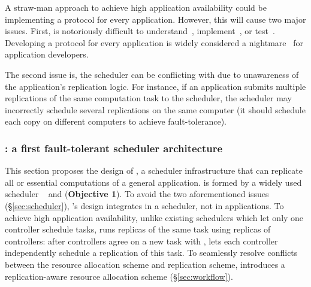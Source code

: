 A straw-man approach to achieve high application availability could be 
implementing a \paxos protocol for every application. However, this will cause 
two major issues. First, \paxos is notoriously difficult to 
understand~\cite{raft:usenix14,paxos:simple}, implement~\cite{paxos:practical, 
paxos:live}, or test~\cite{modist:nsdi09,demeter:sosp11}. Developing a 
\paxos protocol for every application is widely considered a 
nightmare~\cite{modist:nsdi09,demeter:sosp11,paxos:live} for application 
developers.

The second issue is, the scheduler can be conflicting with \paxos due to 
unawareness of the application's \paxos replication logic. For instance, if an 
application submits multiple replications of the same computation task to the 
scheduler, the scheduler may incorrectly schedule several replications on the 
same computer (it should schedule each copy on different computers to achieve 
\paxos fault-tolerance).

\vspace{-.15in}\subsubsection{\tripod: a first fault-tolerant scheduler 
architecture} 
\label{sec:scheduler-arch}\vspace{-.075in}

This section proposes the design of \tripod, a scheduler infrastructure that 
can replicate all or essential computations of a general application. 
\tripod is formed by a widely used scheduler \mesos~\cite{mesos:nsdi11} and 
\falcon (\textbf{Objective 1}). To avoid the two aforementioned issues 
(\S\ref{sec:scheduler}), \tripod's design integrates \paxos in a scheduler, 
not in applications. To achieve high application availability, unlike existing 
schedulers which let only one controller schedule tasks, \tripod runs replicas 
of the same task using replicas of controllers: after controllers agree on a 
new task with \falcon, \tripod lets each controller independently schedule a 
replication of this task. To seamlessly resolve conflicts between the resource 
allocation scheme and replication scheme, \tripod introduces a 
replication-aware 
resource allocation scheme (\S\ref{sec:workflow}).



